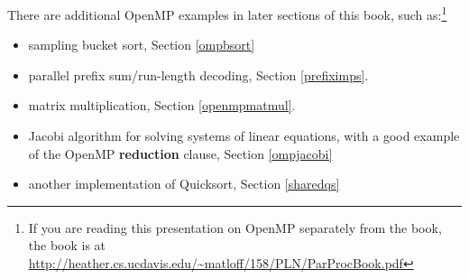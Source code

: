 There are additional OpenMP examples in later sections of this book,
such as:\footnote{If you are reading this presentation on OpenMP
separately from the book, the book is at
\url{http://heather.cs.ucdavis.edu/~matloff/158/PLN/ParProcBook.pdf}
}

\begin{itemize}

\item sampling bucket sort, Section \ref{ompbsort}

\item parallel prefix sum/run-length decoding, Section \ref{prefiximps}.

\item matrix multiplication, Section \ref{openmpmatmul}.

\item Jacobi algorithm for solving systems of linear equations, with a
good example of the OpenMP {\bf reduction} clause, Section
\ref{ompjacobi}

\item another implementation of Quicksort, Section \ref{sharedqs}

\end{itemize}


